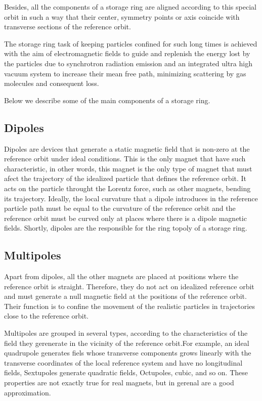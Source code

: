 \documentclass[
	12pt,				%
	openright,			%
	oneside,			%
	a4paper,		%
	chapter=TITLE,		%
	section=TITLE,		%
    brazil,				%
	english,			%
	sumario=tradicional,
	]{abntex2}
\begin{document}
  Besides, all the components of a storage ring are aligned according to this special orbit in such a way that their center, symmetry points or axis coincide with transverse sections of the reference orbit.

  The storage ring task of keeping particles confined for such long times is achieved with the aim of electromagnetic fields to guide and replenish the energy lost by the particles due to synchrotron radiation emission and an integrated ultra high vacuum system to increase their mean free path, minimizing scattering by gas molecules and consequent loss.

  Below we describe some of the main components of a storage ring.

    \subsection{Dipoles}

    Dipoles are devices that generate a static magnetic field that is non-zero at the reference orbit under ideal conditions. This is the only magnet that have such characteristic, in other words, this magnet is the only type of magnet that must afect the trajectory of the idealized particle that defines the reference orbit. It acts on the particle throught the Lorentz force, such as other magnets, bending its trajectory. Ideally, the local curvature that a dipole introduces in the reference particle path must be equal to the curvature of the reference orbit and the reference orbit must be curved only at places where there is a dipole magnetic fields. Shortly, dipoles are the responsible for the ring topoly of a storage ring.

    \subsection{Multipoles}

    Apart from dipoles, all the other magnets are placed at positions where the reference orbit is straight. Therefore, they do not act on idealized reference orbit and must generate a null magnetic field at the positions of the reference orbit. Their function is to confine the movement of the realistic particles in trajectories close to the reference orbit.

    Multipoles are grouped in several types, according to the characteristics of the field they gerenerate in the vicinity of the reference orbit.For example, an ideal quadrupole generates fiels whose transverse components grows linearly with the transverse coordinates of the local reference system and have no longitudinal fields, Sextupoles generate quadratic fields, Octupoles, cubic, and so on. These properties are not exactly true for real magnets, but in gerenal are a good approximation.
\end{document}
